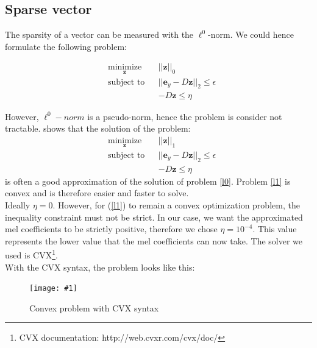 \documentclass[a4paper]{report}
\newcommand{\img}[3]{\begin{figure}[!h] \centering \texttt{[image: \#1]}\captionsetup{justification=centering} \caption{#3} \label{#1} \end{figure}}
\newcommand{\ey}{\textbf{e}_y}
\newcommand{\zhat}{ \hat{\textbf{z}} }
\begin{document}
\subsection{Sparse vector}
The sparsity of a vector can be measured with the $\ell^0$-norm. We could hence formulate the following problem:

\begin{equation}
  \begin{aligned}
    & \underset{\mathbf{z}}{\text{minimize}}
    & & ||\mathbf{z}||_0 \\
    & \text{subject to}
    & & ||\ey -D\mathbf{z}||_2 \leq \epsilon\\
    &&& -D\mathbf{z} \leq \eta
  \end{aligned}
\label{l0}
\end{equation}


However, $\ell^0-norm$ is a pseudo-norm, hence the problem is consider not tractable. \cite{equivalencel1l0} shows that the solution of the problem:
\begin{equation}
  \begin{aligned}
    & \underset{\mathbf{z}}{\text{minimize}}
    & & ||\mathbf{z}||_1 \\
    & \text{subject to}
    & & ||\ey -D\mathbf{z}||_2 \leq \epsilon\\
    &&& -D\mathbf{z} \leq \eta
  \end{aligned}
\label{l1}
\end{equation}
 is often a good approximation of the solution of problem \ref{l0}. Problem \ref{l1} is convex and is therefore easier and faster to solve.\\
Ideally $\eta = 0$. However, for (\ref{l1}) to remain a convex optimization problem, the inequality constraint must not be strict. In our case, we want the approximated mel coefficients to be strictly positive, therefore we chose $\eta = 10^{-4}$. This value represents the lower value that the mel coefficients can now take.
The solver we used is CVX\footnote{CVX documentation: http://web.cvxr.com/cvx/doc/}.\\

With the CVX syntax, the problem looks like this:
\img{convex_problem}{.7}{Convex problem with CVX syntax}
\end{document}
